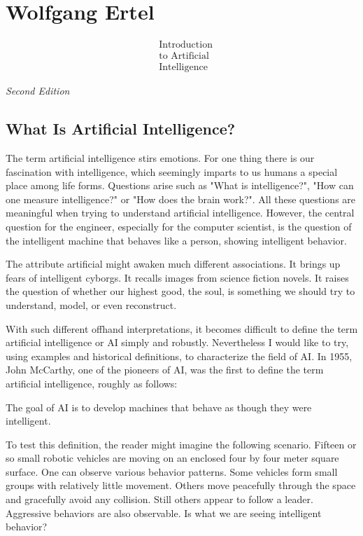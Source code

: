 \documentclass[10pt]{book}
\begin{document}
\tableofcontents

\section{Wolfgang Ertel}
$$
\begin{aligned}
& \text { Introduction } \\
& \text { to Artificial } \\
& \text { Intelligence }
\end{aligned}
$$

\textit{Second Edition}

\tableofcontents

\subsection{What Is Artificial Intelligence?}
The term artificial intelligence stirs emotions. For one thing there is our fascination with intelligence, which seemingly imparts to us humans a special place among life forms. Questions arise such as "What is intelligence?", "How can one measure intelligence?" or "How does the brain work?". All these questions are meaningful when trying to understand artificial intelligence. However, the central question for the engineer, especially for the computer scientist, is the question of the intelligent machine that behaves like a person, showing intelligent behavior.

The attribute artificial might awaken much different associations. It brings up fears of intelligent cyborgs. It recalls images from science fiction novels. It raises the question of whether our highest good, the soul, is something we should try to understand, model, or even reconstruct.

With such different offhand interpretations, it becomes difficult to define the term artificial intelligence or AI simply and robustly. Nevertheless I would like to try, using examples and historical definitions, to characterize the field of AI. In 1955, John McCarthy, one of the pioneers of AI, was the first to define the term artificial intelligence, roughly as follows:

The goal of AI is to develop machines that behave as though they were intelligent.

To test this definition, the reader might imagine the following scenario. Fifteen or so small robotic vehicles are moving on an enclosed four by four meter square surface. One can observe various behavior patterns. Some vehicles form small groups with relatively little movement. Others move peacefully through the space and gracefully avoid any collision. Still others appear to follow a leader. Aggressive behaviors are also observable. Is what we are seeing intelligent behavior?
\end{document}
